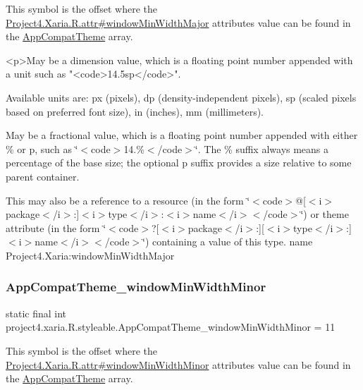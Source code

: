 This symbol is the offset where the \hyperlink{}{Project4.\+Xaria.\+R.\+attr\#window\+Min\+Width\+Major} attribute\textquotesingle{}s value can be found in the \hyperlink{classproject4_1_1xaria_1_1R_1_1styleable_aad8bec413e2350f9404e6ff0e831a85d}{App\+Compat\+Theme} array.

\begin{DoxyVerb}      <p>May be a dimension value, which is a floating point number appended with a unit such as "<code>14.5sp</code>".
\end{DoxyVerb}
 Available units are\+: px (pixels), dp (density-\/independent pixels), sp (scaled pixels based on preferred font size), in (inches), mm (millimeters). 

May be a fractional value, which is a floating point number appended with either \% or p, such as \char`\"{}$<$code$>$14.\%$<$/code$>$\char`\"{}. The \% suffix always means a percentage of the base size; the optional p suffix provides a size relative to some parent container. 

This may also be a reference to a resource (in the form \char`\"{}$<$code$>$@\mbox{[}$<$i$>$package$<$/i$>$\+:\mbox{]}$<$i$>$type$<$/i$>$\+:$<$i$>$name$<$/i$>$$<$/code$>$\char`\"{}) or theme attribute (in the form \char`\"{}$<$code$>$?\mbox{[}$<$i$>$package$<$/i$>$\+:\mbox{]}\mbox{[}$<$i$>$type$<$/i$>$\+:\mbox{]}$<$i$>$name$<$/i$>$$<$/code$>$\char`\"{}) containing a value of this type.  name Project4.\+Xaria\+:window\+Min\+Width\+Major \mbox{\label{classproject4_1_1xaria_1_1R_1_1styleable_af7746fda2052e3559e17aae4ea7bd140}} 
\subsubsection{\texorpdfstring{App\+Compat\+Theme\+\_\+window\+Min\+Width\+Minor}{AppCompatTheme\_windowMinWidthMinor}}
{\footnotesize\ttfamily static final int project4.\+xaria.\+R.\+styleable.\+App\+Compat\+Theme\+\_\+window\+Min\+Width\+Minor = 11\hspace{0.3cm}{\ttfamily [static]}}

This symbol is the offset where the \hyperlink{}{Project4.\+Xaria.\+R.\+attr\#window\+Min\+Width\+Minor} attribute\textquotesingle{}s value can be found in the \hyperlink{classproject4_1_1xaria_1_1R_1_1styleable_aad8bec413e2350f9404e6ff0e831a85d}{App\+Compat\+Theme} array.

